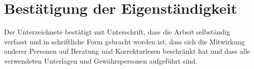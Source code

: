 \chapter{Bestätigung der Eigenständigkeit}
Der Unterzeichnete bestätigt mit Unterschrift, dass die Arbeit selbständig verfasst und in schriftliche Form gebracht worden ist, dass sich die Mitwirkung anderer Personen auf Beratung und Korrekturlesen beschränkt hat und dass alle verwendeten Unterlagen und Gewährspersonen aufgeführt sind.